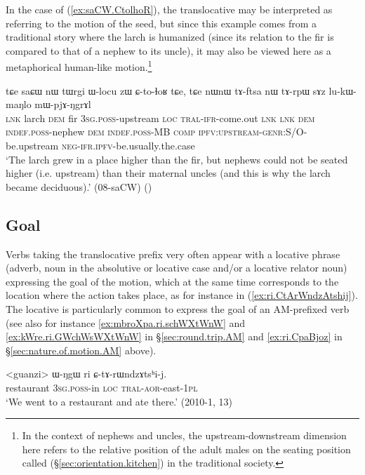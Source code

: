 In the case of (\ref{ex:saCW.CtolhoR}), the translocative may be interpreted as referring to the motion of the seed, but since this example comes from a traditional story where the larch is humanized (since its relation to the fir is compared to that of a nephew to its uncle), it may also be viewed here as a metaphorical human-like motion.\footnote{
In the context of nephews and uncles, the upstream-downstream dimension here refers to the relative position of the adult males on the seating position called   (§\ref{sec:orientation.kitchen}) in the traditional society. } 

\begin{exe}
\ex \label{ex:saCW.CtolhoR}
\gll  tɕe saɕɯ nɯ tɯrgi ɯ-locu zɯ ɕ-to-ɬoʁ tɕe, tɕe nɯnɯ tɤ-ftsa nɯ tɤ-rpɯ sɤz lu-kɯ-maŋlo mɯ-pjɤ-ŋgrɤl\\
\textsc{lnk} larch \textsc{dem} fir \textsc{3sg}.\textsc{poss}-upstream \textsc{loc} \textsc{tral}-\textsc{ifr}-come.out \textsc{lnk} \textsc{lnk}  \textsc{dem} \textsc{indef}.\textsc{poss}-nephew \textsc{dem} \textsc{indef}.\textsc{poss}-MB \textsc{comp} \textsc{ipfv}:\textsc{upstream}-\textsc{genr}:S/O-be.upstream \textsc{neg}-\textsc{ifr}.\textsc{ipfv}-be.usually.the.case\\
\glt `The larch grew in a place higher than the fir, but nephews could not be seated higher (i.e. upstream) than their maternal uncles (and this is why the larch became deciduous).' (08-saCW) ()
\end{exe}
 
 
\subsection{Goal} \label{sec:AM.goal}
Verbs taking the translocative prefix very often appear with a locative phrase (adverb, noun in the absolutive or locative case and/or a locative relator noun) expressing the goal of the motion, which at the same time corresponds to the location where the action takes place, as for instance in (\ref{ex:ri.CtArWndzAtshij}). The locative  is particularly common to express the goal of an AM-prefixed verb (see also for instance  \ref{ex:mbroXpa.ri.schWXtWnW}  and \ref{ex:kWre.ri.GWchWsWXtWnW} in §\ref{sec:round.trip.AM} and \ref{ex:ri.CpaBjoz} in §\ref{sec:nature.of.motion.AM} above).

\begin{exe}
\ex \label{ex:ri.CtArWndzAtshij} 
\gll <guanzi> ɯ-ŋgɯ ri ɕ-tɤ-rɯndzɤtsʰi-j. \\
restaurant \textsc{3sg}.\textsc{poss}-in \textsc{loc} \textsc{tral}-\textsc{aor}-east-\textsc{1pl} \\
\glt `We went to a restaurant and ate there.' (2010-1, 13)
\end{exe}

